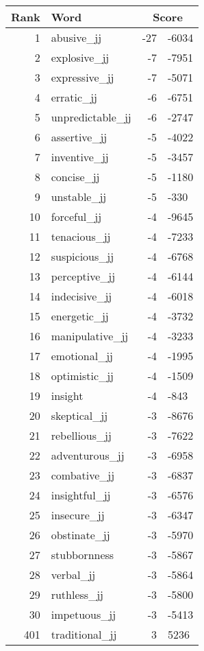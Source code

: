 \begin{longtable}[!htbp]{| rlr@{.}l |}
    \hline
    \textbf{Rank} & \textbf{Word} & \multicolumn{2}{c|}{\textbf{Score}} \\
    \hline
    \endhead
    1 & abusive\_jj & -27 & -6034 \\
    2 & explosive\_jj & -7 & -7951 \\
    3 & expressive\_jj & -7 & -5071 \\
    4 & erratic\_jj & -6 & -6751 \\
    5 & unpredictable\_jj & -6 & -2747 \\
    6 & assertive\_jj & -5 & -4022 \\
    7 & inventive\_jj & -5 & -3457 \\
    8 & concise\_jj & -5 & -1180 \\
    9 & unstable\_jj & -5 & -330 \\
    10 & forceful\_jj & -4 & -9645 \\
    11 & tenacious\_jj & -4 & -7233 \\
    12 & suspicious\_jj & -4 & -6768 \\
    13 & perceptive\_jj & -4 & -6144 \\
    14 & indecisive\_jj & -4 & -6018 \\
    15 & energetic\_jj & -4 & -3732 \\
    16 & manipulative\_jj & -4 & -3233 \\
    17 & emotional\_jj & -4 & -1995 \\
    18 & optimistic\_jj & -4 & -1509 \\
    19 & insight & -4 & -843 \\
    20 & skeptical\_jj & -3 & -8676 \\
    21 & rebellious\_jj & -3 & -7622 \\
    22 & adventurous\_jj & -3 & -6958 \\
    23 & combative\_jj & -3 & -6837 \\
    24 & insightful\_jj & -3 & -6576 \\
    25 & insecure\_jj & -3 & -6347 \\
    26 & obstinate\_jj & -3 & -5970 \\
    27 & stubbornness & -3 & -5867 \\
    28 & verbal\_jj & -3 & -5864 \\
    29 & ruthless\_jj & -3 & -5800 \\
    30 & impetuous\_jj & -3 & -5413 \\
    401 & traditional\_jj & 3 & 5236 \\

\end{longtable}
